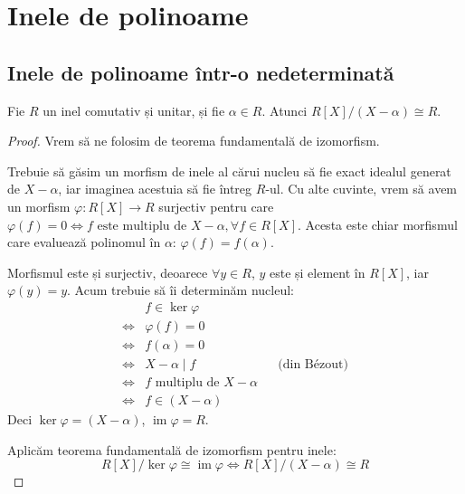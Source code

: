 \section{Inele de polinoame}

\subsection{Inele de polinoame într-o nedeterminată}

\begin{comment}
\begin{exercise}[1.7]
Fie \(R\) un inel comutativ și unitar, și \(f \in R[X]\), \(f = a_0 + a_1 X + \dots + a_n X^n\).
Să se arate că:
\begin{enumerate}
    \item \(f\) este nilpotent dacă și numai dacă \(a_i\) este nilpotent, \(\forall i \in \overline{0, n}\).
    \item \(f\) este inversabil dacă și numai dacă \(a_0\) este inversabil și \(a_i\) este nilpotent, \(\forall i \in \overline{1, n}\).
\end{enumerate}
\end{exercise}
\end{comment}

\begin{exercise}[2.4]
Fie \(R\) un inel comutativ și unitar, și fie \(\alpha \in R\). Atunci \(R[X] / (X - \alpha) \cong R\).
\end{exercise}
\begin{proof}
Vrem să ne folosim de teorema fundamentală de izomorfism.

Trebuie să găsim un morfism de inele al cărui nucleu să fie exact idealul generat de \(X - \alpha\),
iar imaginea acestuia să fie întreg \(R\)-ul.
Cu alte cuvinte, vrem să avem un morfism \(\varphi \colon R[X] \to R\) surjectiv
pentru care \(\varphi(f) = 0 \iff f \text{ este multiplu de } X - \alpha, \forall f \in R[X]\).
Acesta este chiar morfismul care evaluează polinomul în \(\alpha\): \(\varphi(f) = f(\alpha)\).

Morfismul este și surjectiv, deoarece \(\forall y \in R\), \(y\) este și element în \(R[X]\), iar \(\varphi(y) = y\).
Acum trebuie să îi determinăm nucleul:
\begin{align*}
    &f \in \ker \varphi \\
    \iff &\varphi(f) = 0 \\
    \iff &f(\alpha) = 0 \\
    \iff &X - \alpha \mid f && \text{(din Bézout)} \\
    \iff &f \text{ multiplu de } X - \alpha \\
    \iff &f \in (X - \alpha)
\end{align*}
Deci \(\ker \varphi = (X - \alpha)\), \(\operatorname{im} \varphi = R\).

Aplicăm teorema fundamentală de izomorfism pentru inele:
\[
R[X] / \ker \varphi \cong \operatorname{im} \varphi \iff R[X] / (X - \alpha) \cong R
\]
\end{proof}

